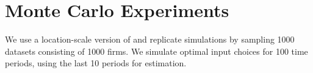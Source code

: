 \documentclass[11pt]{article}
\begin{document}


\section{Monte Carlo Experiments} \label{montecarlo}
We use a location-scale version of \cite{Levinsohn2003} and replicate \cite{Ackerberg2015} simulations by sampling 1000 datasets consisting of 1000 firms. We simulate optimal input choices for 100 time periods, using the last 10 periods for estimation. 
\end{document}
